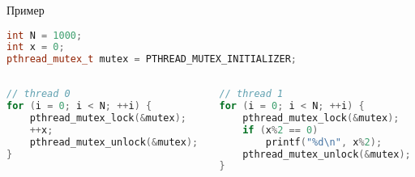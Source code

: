 \begin{frame}[fragile]{Пример}

\begin{lstlisting}[language=C++,basicstyle=\ttfamily,keywordstyle=\color{blue},basicstyle=\scriptsize]
int N = 1000;
int x = 0;
pthread_mutex_t mutex = PTHREAD_MUTEX_INITIALIZER;
\end{lstlisting}

\begin{columns}[t]
    \begin{column}[T]{0.5\textwidth}
    \begin{lstlisting}[language=C++,basicstyle=\ttfamily,keywordstyle=\color{blue},basicstyle=\scriptsize]
// thread 0
for (i = 0; i < N; ++i) {
    pthread_mutex_lock(&mutex);
    ++x;
    pthread_mutex_unlock(&mutex);
}
    \end{lstlisting}
    \end{column}
    \begin{column}[T]{0.5\textwidth}
    \begin{lstlisting}[language=C++,basicstyle=\ttfamily,keywordstyle=\color{blue},basicstyle=\scriptsize]
// thread 1
for (i = 0; i < N; ++i) {
    pthread_mutex_lock(&mutex);
    if (x%2 == 0)
        printf("%d\n", x%2);
    pthread_mutex_unlock(&mutex);
}
    \end{lstlisting}
    \end{column}
\end{columns}

\end{frame}

